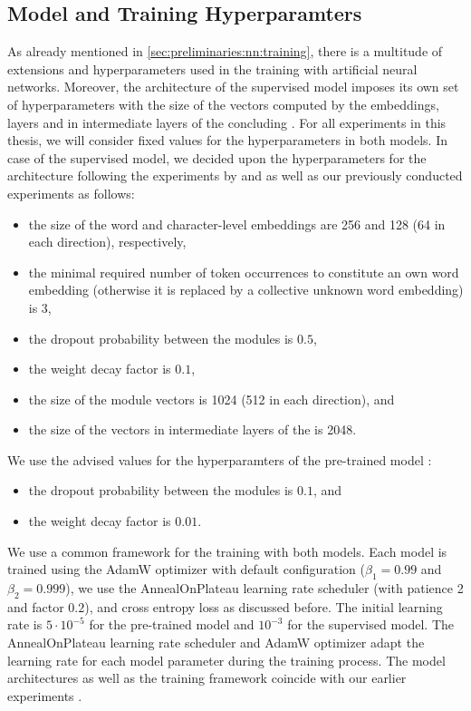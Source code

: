 \documentclass[../../document.tex]{subfiles}
\begin{document}
    \subsection*{Model and Training Hyperparamters}
    As already mentioned in \cref{sec:preliminaries:nn:training}, there is a multitude of extensions and hyperparameters used in the training with artificial neural networks.
    Moreover, the architecture of the supervised model imposes its own set of hyperparameters with the size of the vectors computed by the embeddings,  layers and in intermediate layers of the concluding .
    For all experiments in this thesis, we will consider fixed values for the hyperparameters in both models.
    In case of the supervised model, we decided upon the hyperparameters for the architecture following the experiments by \citet{Cor20} and \citet{StaSte20} as well as our previously conducted experiments \citep{RupMoe21,Rup22} as follows:
    \begin{itemize}
        \item the size of the word and character-level embeddings are 256 and 128 (64 in each direction), respectively,
        \item the minimal required number of token occurrences to constitute an own word embedding (otherwise it is replaced by a collective unknown word embedding) is 3,
        \item the dropout probability between the modules is \(0.5\),
        \item the weight decay factor is \(0.1\),
        \item the size of the  module vectors is 1024 (512 in each direction), and
        \item the size of the vectors in intermediate layers of the  is 2048.
    \end{itemize}
    We use the advised values for the hyperparamters of the pre-trained model \citep[cf.\@][]{Devlin2019}:
    \begin{itemize}
        \item the dropout probability between the modules is \(0.1\), and
        \item the weight decay factor is \(0.01\).
    \end{itemize}

    We use a common framework for the training with both models.
    Each model is trained using the AdamW optimizer with default configuration ($\beta_1 = 0.99$ and $\beta_2 = 0.999$), we use the AnnealOnPlateau learning rate scheduler (with patience 2 and factor \(0.2\)), and cross entropy loss as discussed before.
    The initial learning rate is \(5\cdot 10^{-5}\) for the pre-trained model and \(10^{-3}\) for the supervised model.
    The AnnealOnPlateau learning rate scheduler and AdamW optimizer adapt the learning rate for each model parameter during the training process.
    The model architectures as well as the training framework coincide with our earlier experiments \citep{RupMoe21,Rup22}.
\end{document}
